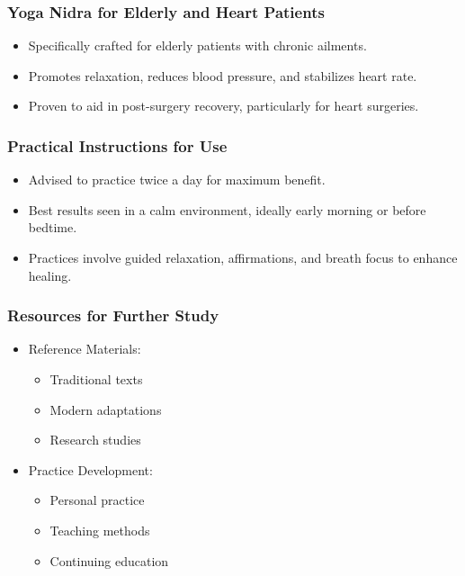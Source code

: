 \begin{frame}[fragile]\frametitle{Yoga Nidra for Elderly and Heart Patients}
    \begin{itemize}
        \item Specifically crafted for elderly patients with chronic ailments.
        \item Promotes relaxation, reduces blood pressure, and stabilizes heart rate.
        \item Proven to aid in post-surgery recovery, particularly for heart surgeries.
    \end{itemize}
\end{frame}

\begin{frame}[fragile]\frametitle{Practical Instructions for Use}
    \begin{itemize}
        \item Advised to practice twice a day for maximum benefit.
        \item Best results seen in a calm environment, ideally early morning or before bedtime.
        \item Practices involve guided relaxation, affirmations, and breath focus to enhance healing.
    \end{itemize}
\end{frame}



\begin{frame}[fragile]\frametitle{Resources for Further Study}
    \begin{itemize}
        \item Reference Materials:
            \begin{itemize}
                \item Traditional texts
                \item Modern adaptations
                \item Research studies
            \end{itemize}
        \item Practice Development:
            \begin{itemize}
                \item Personal practice
                \item Teaching methods
                \item Continuing education
            \end{itemize}
    \end{itemize}
\end{frame}